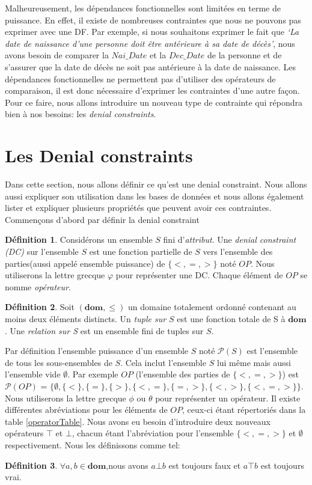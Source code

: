 \documentclass[letterpaper, 12pt]{report}
\theoremstyle{definition}
\newtheorem{mydef}{Définition}
\newcommand{\dom}{\mathbf{dom}}
\begin{document}
Malheureusement, les dépendances fonctionnelles sont limitées en terme de puissance. En effet, il existe de nombreuses contraintes que nous ne pouvons pas exprimer avec une DF. Par exemple, si nous souhaitons exprimer le fait que \emph{`La date de naissance d'une personne doit être antérieure à sa date de décès'}, nous avons besoin de comparer la $Nai\_Date$ et la $Dec\_Date$ de la personne et de s'assurer que la date de décès ne soit pas antérieure à la date de naissance. Les dépendances fonctionnelles ne permettent pas d'utiliser des opérateurs de comparaison, il est donc nécessaire d'exprimer les contraintes d'une autre façon. Pour ce faire, nous allons introduire un nouveau type de contrainte qui répondra bien à nos besoins: les \emph{denial constraints}.

\section{Les Denial constraints}

Dans cette section, nous allons définir ce qu'est une denial constraint. Nous allons aussi expliquer son utilisation dans les bases de données et nous allons également lister et expliquer plusieurs propriétés que peuvent avoir ces contraintes. Commençons d'abord par définir la denial constraint

\begin{mydef}
Considérons un ensemble $S$ fini d'\emph{attribut}. Une \emph{denial constraint (DC)} sur l'ensemble $S$ est une fonction partielle de $S$ vers l'ensemble des parties(aussi appelé ensemble puissance) de $\{ <,=,> \}$ noté $OP$. Nous utiliserons la lettre grecque $\varphi$ pour représenter une DC. Chaque élément de $OP$ se nomme \emph{opérateur}.
\end{mydef}

\begin{mydef}
 Soit $(\dom,\leq)$ un domaine totalement ordonné contenant au moins deux éléments distincts. Un \emph{tuple sur $S$} est une fonction totale de S à $\dom$. Une \emph{relation sur S} est un ensemble fini de tuples sur $S$. 
\end{mydef}

Par définition l'ensemble puissance d'un ensemble $S$ noté $\mathcal{P}(S)$ est l'ensemble de tous les sous-ensembles de $S$. Cela inclut l'ensemble $S$ lui même mais aussi l'ensemble vide $\emptyset$. Par exemple $OP$ (l'ensemble des parties de $\{ <, =, > \}$) est $\mathcal{P}(OP)$ = $\{ \emptyset, \{<\} , \{=\}, \{>\}, \{<,=\}, \{=,>\}, \{<,>\}, \{<,=,>\} \}$. Nous utiliserons la lettre grecque $\phi$ ou $\theta$ pour représenter un opérateur. Il existe différentes abréviations pour les éléments de $OP$, ceux-ci étant répertoriés dans la table \ref{operatorTable}. Nous avons eu besoin d'introduire deux nouveaux opérateurs $\top$ et $\bot$, chacun étant l'abréviation pour l'ensemble $\{<,=,>\}$ et $\emptyset$ respectivement. Nous les définissons comme tel: 
\begin{mydef}$ \forall a,b \in \mathbf{dom}$,nous avons $a \bot b$ est toujours faux et $a \top b$ est toujours vrai. 
\end{mydef}
\end{document}
